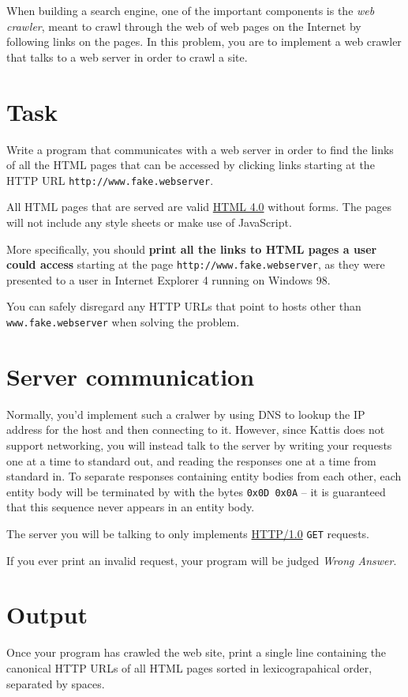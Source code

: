 When building a search engine, one of the important components is the \emph{web crawler}, meant to crawl through the web of web pages on the Internet by following links on the pages.
In this problem, you are to implement a web crawler that talks to a web server in order to crawl a site.

\section*{Task}
Write a program that communicates with a web server in order to find the links of all the HTML pages that can be accessed by clicking links starting at the HTTP URL \texttt{http://www.fake.webserver}.

All HTML pages that are served are valid \href{https://www.w3.org/TR/1998/REC-html40-19980424/}{HTML 4.0} without forms.
The pages will not include any style sheets or make use of JavaScript.

More specifically, you should \textbf{print all the links to HTML pages a user could access} starting at the page \texttt{http://www.fake.webserver}, as they were presented to a user in Internet Explorer 4 running on Windows 98.

You can safely disregard any HTTP URLs that point to hosts other than \texttt{www.fake.webserver} when solving the problem.

\section*{Server communication}
Normally, you'd implement such a cralwer by using DNS to lookup the IP address for the host and then connecting to it.
However, since Kattis does not support networking, you will instead talk to the server by writing your requests one at a time to standard out, and reading the responses one at a time from standard in. To separate responses containing entity bodies from each other, each entity body will be terminated by with the bytes \texttt{0x0D 0x0A} -- it is guaranteed that this sequence never appears in an entity body.

The server you will be talking to only implements \href{https://www.w3.org/Protocols/HTTP/1.0/spec.html}{HTTP/1.0} \texttt{GET} requests.

If you ever print an invalid request, your program will be judged \emph{Wrong Answer}.

\section*{Output}
Once your program has crawled the web site, print a single line containing the canonical HTTP URLs of all HTML pages sorted in lexicograpahical order, separated by spaces.
